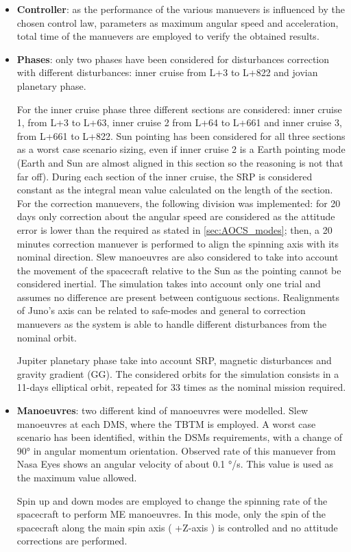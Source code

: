 \begin{itemize}
    \item \textbf{Controller}: as the performance of the various manuevers is influenced by the chosen control law, parameters as maximum angular speed and acceleration, total time of the manuevers are employed to verify the obtained results. 
    
    \item \textbf{Phases}: only two phases have been considered for disturbances correction with different disturbances: inner cruise from L+3 to L+822 and jovian planetary phase. 
    
    For the inner cruise phase three different sections are considered: inner cruise 1, from L+3 to L+63, inner cruise 2 from L+64 to L+661 and inner cruise 3, from L+661 to L+822. Sun pointing has been considered for all three sections as a worst case scenario sizing, even if inner cruise 2 is a Earth pointing mode (Earth and Sun are almost aligned in this section so the reasoning is not that far off). During each section of the inner cruise, the SRP is considered constant as the integral mean value calculated on the length of the section.
     For the correction manuevers, the following division was implemented: for 20 days only correction about the angular speed are considered as the attitude error is lower than the required as stated in \autoref{sec:AOCS_modes}; then, a 20 minutes correction manuever is performed to align the spinning axis with its nominal direction. Slew manoeuvres are also considered to take into account the movement of the spacecraft relative to the Sun as the pointing cannot be considered inertial. The simulation takes into account only one trial and assumes no difference are present between contiguous sections. Realignments of Juno's axis can be related to safe-modes and general to correction manuevers as the system is able to handle different disturbances from the nominal orbit. 
    
    Jupiter planetary phase take into account SRP, magnetic disturbances and gravity gradient (GG). The considered orbits for the simulation consists in a 11-days elliptical orbit, repeated for 33 times as the nominal mission required. 

    \item \textbf{Manoeuvres}: two different kind of manoeuvres were modelled. Slew manoeuvres at each DMS, where the TBTM is employed. A worst case scenario has been identified, within the DSMs requirements, with a change of 90° in angular momentum orientation. Observed rate of this manuever from Nasa Eyes\cite{nasa_eyes} shows an angular velocity of about 0.1 °/s. This value is used as the maximum value allowed. 
    
    Spin up and down modes are employed to change the spinning rate of the spacecraft to perform ME manoeuvres. In this mode, only the spin of the spacecraft along the main spin axis ( +Z-axis ) is controlled and no attitude corrections are performed.      

\end{itemize}

